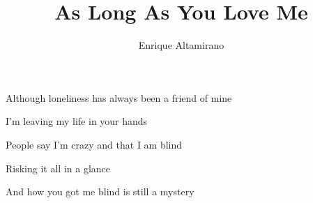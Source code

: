 \documentclass[english]{article}
\begin{document}
\title{As Long As You Love Me}
\author{Enrique Altamirano}

\maketitle
\begin{center}
Although loneliness has always been a friend of mine 
\par\end{center}
\begin{center}
I'm leaving my life in your hands 
\par\end{center}
\begin{center}
People say I'm crazy and that I am blind 
\par\end{center}
\begin{center}
Risking it all in a glance  
\par\end{center}

\begin{center}
And how you got me blind is still a mystery 
\par\end{center}
\end{document}
